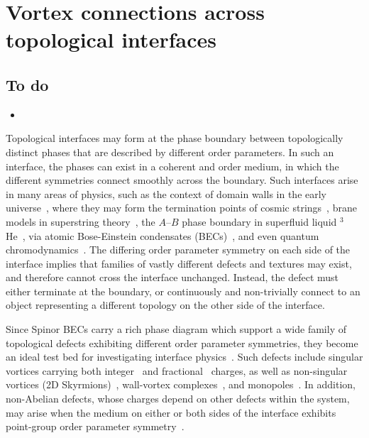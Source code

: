 \chapter{Vortex connections across topological interfaces}\label{chap: spin-2}
\section{To do}
\begin{itemize}
    \item 
\end{itemize}


Topological interfaces may form at the phase boundary between topologically
distinct phases that are described by different order parameters.
In such an interface, the phases can exist in a coherent and order medium, in
which the different symmetries connect smoothly across the boundary.
Such interfaces arise in many areas of physics, such as the context of domain
walls in the early universe~\cite{Zeldovich1975,Kibble1976,Kibble1980}, where
they may form the termination points of cosmic strings~\cite{Vilenkin1985},
brane models in superstring theory~\cite{Dvali1999,Sarangi2002,Gudnason2015},
the \(A\)--\(B\) phase boundary in superfluid liquid \(^3\)He~\cite{
    Osheroff1977,Yip1986,Salomaa1987,Finne2006,Bradley2007,Volovik2009}, via
atomic Bose-Einstein condensates (BECs)~\cite{Takeuchi2006,Kasamatsu2010,
    Borgh2012,Borgh2013, Borgh2014,Kaneda2014}, and even quantum
chromodynamics~\cite{Alford2001,Cipriani2012,Eto2014}.
The differing order parameter symmetry on each side of the interface implies
that families of vastly different defects and textures may exist, and therefore
cannot cross the interface unchanged.
Instead, the defect must either terminate at the boundary, or continuously
and non-trivially connect to an object representing a different topology on the
other side of the interface.

Since Spinor BECs carry a rich phase diagram which support a wide family of
topological defects exhibiting different order parameter symmetries, they become
an ideal test bed for investigating interface physics~\cite{Borgh2012,Borgh2013,
    Borgh2014}.
Such defects include singular vortices carrying both integer~\cite{Yip1999,
    Isoshima2002,Mizushima2002a,Zhou2003,Sadler2006,Semenoff2007,Kobayashi2009,
    Lovegrove2012,Lovegrove2016,Borgh2016a,Weiss2019,Xiao2021,Xiao2022} and
fractional~\cite{Leonhardt2000,Ji2008,Seo2015,Semenoff2007,Lovegrove2012,
    Lovegrove2016,Borgh2016a,Borgh2017,Xiao2021,Xiao2022} charges, as well as
non-singular vortices (2D Skyrmions)~\cite{Ohmi1998, Ho1998, Mizushima2002,
    Martikainen2002, Leanhardt2003, Mizushima2004, Choi2012, Choi2012a,
    Lovegrove2014,Weiss2019}, wall-vortex complexes~\cite{Kang2019,
    Takeuchi2021}, and monopoles~\cite{Stoof2001,
    Savage2003,Ruostekoski2003,Pietila2009,Ray2014,Ray2015,Ollikainen2017,
    Mithun2022}.
In addition, non-Abelian defects, whose charges depend on other defects within
the system, may arise when the medium on either or both sides of the interface
exhibits point-group order parameter symmetry~\cite{Xiao2022}.

